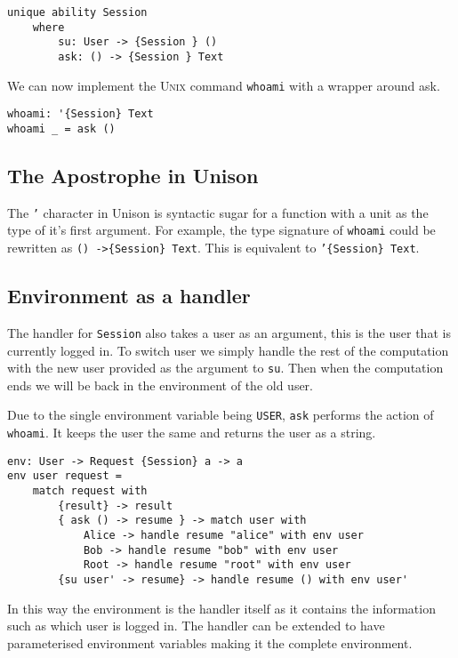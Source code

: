 \documentclass[logo,bsc,singlespacing,parskip]{infthesis}
\begin{document}
\begin{lstlisting}[language=unison]
unique ability Session
    where
        su: User -> {Session } ()
        ask: () -> {Session } Text
\end{lstlisting}

We can now implement the \textsc{Unix} command \texttt{whoami} with a wrapper
around ask.

\begin{lstlisting}[language=unison]
whoami: '{Session} Text
whoami _ = ask ()
\end{lstlisting}

\subsection{The Apostrophe in Unison}

The \texttt{'} character in Unison is syntactic sugar for a function with a
unit as the type of it's first argument. For example, the type signature of 
\texttt{whoami} could be rewritten as \texttt{() ->\{Session\} Text}. This is 
equivalent to \texttt{'\{Session\} Text}.

\subsection{Environment as a handler}

The handler for \texttt{Session} also takes a user as an argument, this is the
user that is currently logged in. To switch user we simply handle the rest of
the computation with the new user provided as the argument to \texttt{su}. Then
when the computation ends we will be back in the environment of the old user.

Due to the single environment variable being \texttt{USER}, \texttt{ask}
performs the action of \texttt{whoami}. It keeps the user the same and returns
the user as a string.

\begin{lstlisting}[language=unison]
env: User -> Request {Session} a -> a
env user request = 
    match request with
        {result} -> result
        { ask () -> resume } -> match user with 
            Alice -> handle resume "alice" with env user
            Bob -> handle resume "bob" with env user
            Root -> handle resume "root" with env user
        {su user' -> resume} -> handle resume () with env user'
\end{lstlisting}

In this way the environment is the handler itself as it contains the information such as which user is logged in. The handler can be extended to have parameterised environment variables making it the complete environment.
\end{document}
